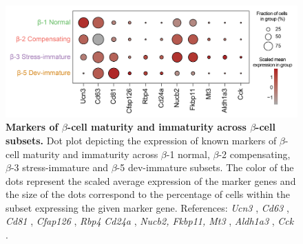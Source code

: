 


\begin{figure}[t]
    \centering
    \includegraphics[width=\linewidth]{Chapter6/Fig/F3-23-01.png}
    \caption[Markers of $\beta$-cell maturity and immaturity across $\beta$-cell subsets]{\textbf{Markers of $\beta$-cell maturity and immaturity across $\beta$-cell subsets.} Dot plot depicting the expression of known markers of $\beta$-cell maturity and immaturity across $\beta$-1 normal, $\beta$-2 compensating, $\beta$-3 stress-immature and $\beta$-5 dev-immature subsets. The color of the dots represent the scaled average expression of the marker genes and the size of the dots correspond to the percentage of cells within the subset expressing the given marker gene. References: \textit{Ucn3} \textbf{\cite{blum_functional_2012}}, \textit{Cd63} \textbf{\cite{rubio-navarro_beta_2023}}, \textit{Cd81} \textbf{\cite{salinno_cd81_2021}}, \textit{Cfap126} \textbf{\cite{bader_identification_2016}}, \textit{Rbp4} \textbf{\cite{camunas-soler_patch-seq_2020}} \textit{Cd24a} \textbf{\cite{dror_epigenetic_2023}}, \textit{Nucb2, Fkbp11, Mt3}  \textbf{\cite{hrovatin_delineating_2023}}, \textit{Aldh1a3} \textbf{\cite{hrovatin_delineating_2023,kim-muller_aldehyde_2016,cinti_evidence_2016}}, \textit{Cck} \textbf{\cite{sachs_targeted_2020,chung_endocrine-exocrine_2020}}.}
    \label{fig:chp6_betacellmarkers}
\end{figure}

